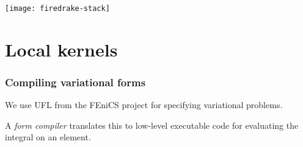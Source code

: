 \documentclass[presentation]{beamer}
\begin{document}
\begin{frame}
  \texttt{[image: firedrake-stack]}
\end{frame}

\section{Local kernels}

\begin{frame}
  \frametitle{Compiling variational forms}

  We use UFL \parencite{Alnaes:2014} from the FEniCS project for
  specifying variational problems.

  A \emph{form compiler} translates this to low-level executable code
  for evaluating the integral on an element.
\end{frame}
\end{document}
